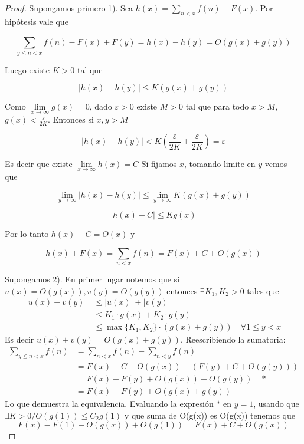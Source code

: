 \documentclass[12pt, a4paper]{article}
\newcommand{\abs}[1]{\left|#1\right|}
\theoremstyle{plain}
\theoremstyle{definition}
\theoremstyle{remark}
\begin{document}
\begin{proof}
    Supongamos primero 1). Sea $h(x) = \sum_{n<x} f(n) - F(x)$. Por hipótesis vale que

    \[
    \sum_{y \leq n<x}^{} f(n) - F(x) + F(y) = h(x) - h(y) = O(g(x) + g(y))
    \]

    Luego existe $K>0$ tal que 

    \[
    \abs{h(x)-h(y)} \leq K(g(x) + g(y))
    \]

    Como $\lim\limits_{x \to \infty} g(x) = 0$, dado $\varepsilon >0$ existe $M>0$ tal que para todo $x>M$,
     $g(x) < \frac{\varepsilon}{2K}$. Entonces si $x,y > M$

     \[
     \abs{h(x)-h(y)} < K\left(\frac{\varepsilon}{2K} + \frac{\varepsilon}{2K}\right) = \varepsilon
     \]

     Es decir que existe $\lim\limits_{x \to \infty} h(x) = C$
     Si fijamos $x$, tomando limite en $y$ vemos que

     \[
     \lim_{y \to \infty} \abs{h(x) - h(y)} \leq \lim_{y \to \infty} K(g(x) + g(y))
     \]

     \[
     \abs{h(x) - C} \leq Kg(x)
     \]

     Por lo tanto $h(x) - C = O(x)$ y

     \[
     h(x) + F(x) = \sum_{n<x} f(n) = F(x) + C + O(g(x))
     \]

    Supongamos 2). En primer lugar notemos que si $u(x) = O(g(x)) , v(y) = O(g(y))$ entonces $\exists K_1,K_2 > 0$ tales que  
    \begin{align*}
    \abs{u(x) + v(y)}
    &\leq \abs{u(x)} + \abs{v(y)}\\
    &\leq K_1 \cdot g(x) + K_2 \cdot g(y)\\
    &\leq \max\{K_1,K_2\} \cdot (g(x) + g(y)) \quad \forall 1 \leq y < x
    \end{align*}
    Es decir $u(x) + v(y) = O(g(x) + g(y))$. Reescribiendo la sumatoria:
    \begin{align*}
    \sum_{y \leq n<x}^{} f(n) &= \sum_{n<x} f(n) - \sum_{n<y} f(n) \\
    &= F(x) + C + O(g(x)) - (F(y) + C + O(g(y)))\\
    &= F(x) - F(y) + O(g(x)) + O(g(y)) \quad *\\ 
    &= F(x) - F(y) + O(g(x) + g(y))
    \end{align*}
    Lo que demuestra la equivalencia. Evaluando la expresión $*$ en $y = 1$, usando que 
    $\exists K > 0 / O(g(1)) \leq C_2g(1)$ y que suma de O(g(x)) es O(g(x)) tenemos que 
    \[
    F(x) - F(1) + O(g(x)) + O(g(1)) = F(x) + C + O(g(x))
    \]


\end{proof}
\end{document}
